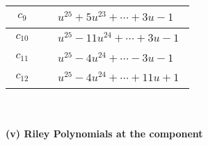 \documentclass[1p]{elsarticle_modified}
\theoremstyle{definition}
\begin{document}
\begin{tabular}{m{50pt}|m{274pt}}
\hline $$\begin{aligned}c_{9}\end{aligned}$$&$\begin{aligned}
&u^{25}+5 u^{23}+\cdots+3 u-1
\end{aligned}$\\
\hline $$\begin{aligned}c_{10}\end{aligned}$$&$\begin{aligned}
&u^{25}-11 u^{24}+\cdots+3 u-1
\end{aligned}$\\
\hline $$\begin{aligned}c_{11}\end{aligned}$$&$\begin{aligned}
&u^{25}-4 u^{24}+\cdots-3 u-1
\end{aligned}$\\
\hline $$\begin{aligned}c_{12}\end{aligned}$$&$\begin{aligned}
&u^{25}-4 u^{24}+\cdots+11 u+1
\end{aligned}$\\
\hline
\end{tabular}\\~\\
\newpage\renewcommand{\arraystretch}{1}
\flushleft \textbf{(v) Riley Polynomials at the component}\newline \\
\end{document}
